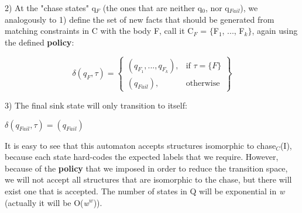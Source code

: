 \documentclass[11pt, a4paper, dvipsnames]{article}
\begin{document}
2) At the "chase states" q$_{F}$ (the ones that are neither q$_{0}$, nor q$_{Fail}$), we analogously to 1) define the set of new facts that should be generated from matching constraints in C with the body F, call it C$_{F}$ = $\{$F$_{1}$, ..., F$_{k}\}$, again using the defined \textbf{policy}:
\begin{center}
\[\delta(q_{F},\tau) = \left\{\begin{array}{lr}
        (q_{F_{1}}, ..., q_{F_{k}}), & \text{if } \tau = \{F\}\\
        (q_{Fail}), & \text{otherwise} 
        \end{array}\right\}
  \] 
\end{center}
3) The final sink state will only transition to itself:
\begin{center}
$\delta(q_{Fail},\tau) = (q_{Fail})$ 
\end{center}
It is easy to see that this automaton accepts structures isomorphic to chase$_{C}$(I), because each state hard-codes the expected labels that we require. However, because of the \textbf{policy} that we imposed in order to reduce the transition space, we will not accept all structures that are isomorphic to the chase, but there will exist one that is accepted.\newline
The number of states in Q will be exponential in \textit{w} (actually it will be O(\textit{w}$^{w}$)).
\end{document}
